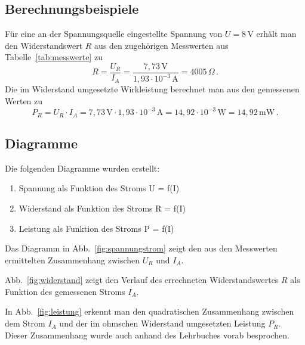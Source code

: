 \documentclass[12pt,a4paper,ngerman]{article}
\begin{document}
\subsection{Berechnungsbeispiele}
%
Für eine an der Spannungsquelle eingestellte Spannung von $U=8\,$V erhält man den Widerstandswert $R$ aus den zugehörigen Messwerten aus Tabelle~\ref{tab:messwerte} zu
\begin{equation}\label{eq:bsp_widerstand}
	R = \frac{U_R}{I_A}=\frac{7,73\,\mathrm{V}}{1,93\cdot10^{-3}\,\mathrm{A}}= 4005\,\Omega\,.
\end{equation}
Die im Widerstand umgesetzte Wirkleistung berechnet man aus den gemessenen Werten zu
\begin{equation}\label{eq:bsp_leistung}
	P_R = {U_R}\cdot{I_A}={7,73\,\mathrm{V}}\cdot{1,93\cdot10^{-3}\,\mathrm{A}}=
	14,92\cdot10^{-3}\,\mathrm{W}= 14,92\,\mathrm{mW}\,.
\end{equation}

\subsection{Diagramme}
%
Die folgenden Diagramme wurden erstellt:

\begin{enumerate}
	\item Spannung als Funktion des Stroms U = f(I)
	\item Widerstand als Funktion des Stroms R = f(I)
	\item Leistung als Funktion des Stroms P = f(I)
\end{enumerate}

Das Diagramm in Abb.~\ref{fig:spannungstrom} zeigt den aus den
Messwerten ermittelten Zusammenhang zwischen $U_R$ und $I_A$.

Abb.~\ref{fig:widerstand} zeigt den Verlauf des errechneten Widerstandswertes $R$ als Funktion des gemessenen Stroms $I_A$.

In Abb.~\ref{fig:leistung} erkennt man den quadratischen Zusammenhang zwischen dem Strom $I_A$ und der im ohmschen Widerstand umgesetzten Leistung $P_R$. Dieser Zusammenhang wurde auch anhand des Lehrbuches \cite{Buch:Deimel1} vorab besprochen. \cite{unbehauen2013elektrische}

%
\pagebreak
\end{document}
